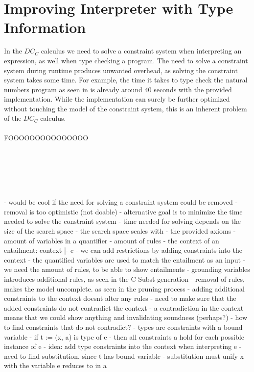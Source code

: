 \chapter{Improving Interpreter with Type Information}
In the $DC_C$ calculus we need to solve a constraint system
when interpreting an expression, as well when type checking a program.
The need to solve a constraint system during runtime produces unwanted overhead,
as solving the constraint system takes some time.
For example, the time it takes to type check the natural numbers program
as seen in  is already around 40 seconds
with the provided implementation.
While the implementation can surely be further optimized
without touching the model of the constraint system,
this is an inherent problem of the $DC_C$ calculus.\\
\\
FOOOOOOOOOOOOOOO


\quad\\\\\\\\\\
- would be cool if the need for solving a constraint system could be removed
- removal is too optimistic (not doable)
- alternative goal is to minimize the time needed to solve the constraint system
- time needed for solving depends on the size of the search space
- the search space scales with
  - the provided axioms
    - amount of variables in a quantifier
    - amount of rules
  - the context of an entailment: context |- c
    - we can add restrictions by adding constraints into the context
- the quantified variables are used to match the entailment as an input
- we need the amount of rules, to be able to show entailments
- grounding variables introduces additional rules, as seen in the C-Subst generation
- removal of rules, makes the model uncomplete. as seen in the pruning process
- adding additional constraints to the context doesnt alter any rules
- need to make sure that the added constraints do not contradict the context
  - a contradiction in the context means that we could show anything and invalidating soundness (perhaps?)
- how to find constraints that do not contradict?
- types are constraints with a bound variable
- if t := (x, a) is type of e
  - then all constraints a hold for each possible instance of e
- idea: add type constraints into the context when interpreting e
- need to find substitution, since t has bound variable
  - substitution must unify x with the variable e reduces to in a

